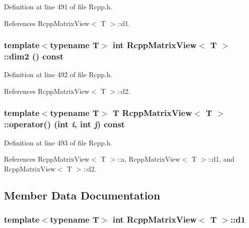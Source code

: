 Definition at line 491 of file Rcpp.h.

References RcppMatrixView$<$ T $>$::d1.\hypertarget{classRcppMatrixView_ebb7f65646ce780c897dc39f31899439}{
\subsubsection[dim2]{\setlength{\rightskip}{0pt plus 5cm}template$<$typename T$>$ int {\bf RcppMatrixView}$<$ T $>$::dim2 () const}}
\label{classRcppMatrixView_ebb7f65646ce780c897dc39f31899439}




Definition at line 492 of file Rcpp.h.

References RcppMatrixView$<$ T $>$::d2.\hypertarget{classRcppMatrixView_d135a7e855eee55b078807766aff9e96}{
\subsubsection[operator()]{\setlength{\rightskip}{0pt plus 5cm}template$<$typename T$>$ T {\bf RcppMatrixView}$<$ T $>$::operator() (int {\em i}, \/  int {\em j}) const}}
\label{classRcppMatrixView_d135a7e855eee55b078807766aff9e96}




Definition at line 493 of file Rcpp.h.

References RcppMatrixView$<$ T $>$::a, RcppMatrixView$<$ T $>$::d1, and RcppMatrixView$<$ T $>$::d2.

\subsection{Member Data Documentation}
\hypertarget{classRcppMatrixView_d492401691ef709f6d2ef7dc1dcc2134}{
\subsubsection[d1]{\setlength{\rightskip}{0pt plus 5cm}template$<$typename T$>$ int {\bf RcppMatrixView}$<$ T $>$::{\bf d1}}}
\label{classRcppMatrixView_d492401691ef709f6d2ef7dc1dcc2134}




